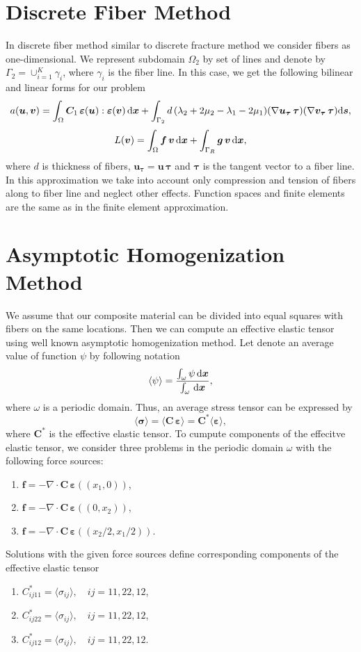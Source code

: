 \documentclass[a4paper]{jpconf}
\begin{document}
\section{Discrete Fiber Method}

In discrete fiber method similar to discrete fracture method we consider fibers as one-dimensional. We represent subdomain $\Omega_2$ by set of lines and denote by $\Gamma_2=\cup_{i=1}^K \gamma_i$, where $\gamma_i$ is the fiber line.
In this case, we get the following bilinear and linear forms for our problem
\[
a(\bm{u}, \bm{v}) = \int_\Omega \bm{C}_1\, \bm{\varepsilon}(\bm{u}) : \bm\varepsilon(\bm{v})\, {\rm d}\bm{x}
+ \int_{\Gamma_{2}} d\, (\lambda_2 + 2\mu_2 - \lambda_1 - 2\mu_1) (\nabla \bm{u}_{\bm{\tau}}\, {\bm{\tau}})(\nabla \bm{v}_{\bm{\tau}}\, {\bm{\tau}}) {\rm d}\bm{s},
\]
\[
L(\bm v) = \int_{\Omega}\bm{f}\, \bm{v}\, {\rm d}\bm{x} +\int_{\Gamma_R}\bm{g}\, \bm{v}\, {\rm{d}}\bm{x},
\]
where $d$ is thickness of fibers, $\bm{u}_{\bm{\tau}} = \bm{u}\, \bm{\tau}$ and $\bm{\tau}$ is the tangent vector to a fiber line. 
In this approximation we take into account only compression and tension of fibers along to fiber line and neglect other effects. Function spaces and finite elements are the same as in the finite element approximation.

\section{Asymptotic Homogenization Method}
We assume that our composite material can be divided into equal squares with fibers on the same locations. Then we can compute an effective elastic tensor using well known asymptotic homogenization method. Let denote an average value of function $\psi$ by following notation
\[
\langle\psi\rangle = \frac{\int_\omega \psi \, {\rm d}\bm{x}}{\int_\omega \, {\rm d}\bm{x}},
\]
where $\omega$ is a periodic domain.
Thus, an average stress tensor can be expressed by
\[
\langle \bm{\sigma} \rangle = \langle \bm{C}\, \bm{\varepsilon} \rangle = \bm{C^*} \langle \bm{\varepsilon}\rangle,
\]
where $\bm{C^*}$ is the effective elastic tensor. To cumpute components of the effecitve elastic tensor, we consider three problems in the periodic domain $\omega$ with the following force sources:
\begin{enumerate}
\item $\bm{f} = -\nabla \cdot \bm{C}\, \bm{\varepsilon}((x_1, 0))$,
\item $\bm{f} = -\nabla \cdot \bm{C}\, \bm{\varepsilon}((0, x_2))$,
\item $\bm{f} = -\nabla \cdot \bm{C}\, \bm{\varepsilon}((x_2/2, x_1/2))$.
\end{enumerate}
Solutions with the given force sources define corresponding components of the effective elastic tensor
\begin{enumerate}
\item $C^*_{ij11} = \langle \sigma_{ij} \rangle, \quad ij=11, 22, 12$,
\item $C^*_{ij22} = \langle \sigma_{ij} \rangle, \quad ij=11, 22, 12$,
\item $C^*_{ij12} = \langle \sigma_{ij} \rangle, \quad ij=11, 22, 12$.
\end{enumerate}
\end{document}
